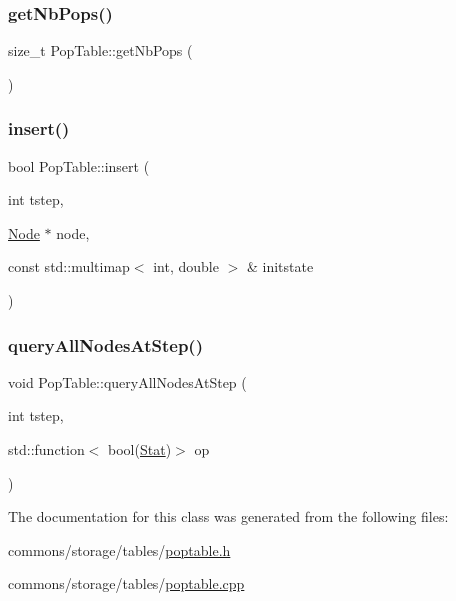 \mbox{\label{class_pop_table_a79062d746df1e7dda6061c2105e0e418}} 
\subsubsection{\texorpdfstring{getNbPops()}{getNbPops()}}
{\footnotesize\ttfamily size\+\_\+t Pop\+Table\+::get\+Nb\+Pops (\begin{DoxyParamCaption}{ }\end{DoxyParamCaption})}

\mbox{\label{class_pop_table_ab2223d3a850c264d33ef1ffb542823eb}} 
\subsubsection{\texorpdfstring{insert()}{insert()}}
{\footnotesize\ttfamily bool Pop\+Table\+::insert (\begin{DoxyParamCaption}\item[{int}]{tstep,  }\item[{\mbox{\hyperlink{class_node}{Node}} $\ast$}]{node,  }\item[{const std\+::multimap$<$ int, double $>$ \&}]{initstate }\end{DoxyParamCaption})}

\mbox{\label{class_pop_table_ade975fd272ea909ceb25caf5ebd46013}} 
\subsubsection{\texorpdfstring{queryAllNodesAtStep()}{queryAllNodesAtStep()}}
{\footnotesize\ttfamily void Pop\+Table\+::query\+All\+Nodes\+At\+Step (\begin{DoxyParamCaption}\item[{int}]{tstep,  }\item[{std\+::function$<$ bool(\mbox{\hyperlink{struct_pop_table_1_1_stat}{Stat}})$>$}]{op }\end{DoxyParamCaption})}



The documentation for this class was generated from the following files\+:\begin{DoxyCompactItemize}
\item 
commons/storage/tables/\mbox{\hyperlink{poptable_8h}{poptable.\+h}}\item 
commons/storage/tables/\mbox{\hyperlink{poptable_8cpp}{poptable.\+cpp}}\end{DoxyCompactItemize}
